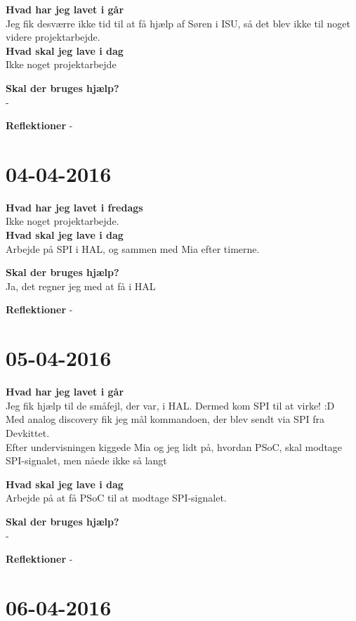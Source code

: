 \documentclass{article}
\begin{document}
	\textbf{Hvad har jeg lavet i går}\\
	Jeg fik desværre ikke tid til at få hjælp af Søren i ISU, så det blev ikke til noget videre projektarbejde.\\
	
	\textbf{Hvad skal jeg lave i dag}\\
	Ikke noget projektarbejde
	
	\textbf{Skal der bruges hjælp?}\\
	-
	
	\textbf{Reflektioner}
	-
	
	
	\section{04-04-2016}
	
	\textbf{Hvad har jeg lavet i fredags}\\
	Ikke noget projektarbejde.\\
	
	\textbf{Hvad skal jeg lave i dag}\\
	Arbejde på SPI i HAL, og sammen med Mia efter timerne.
	
	\textbf{Skal der bruges hjælp?}\\
	Ja, det regner jeg med at få i HAL
	
	\textbf{Reflektioner}
	-
	
	
	\section{05-04-2016}
	
	\textbf{Hvad har jeg lavet i går}\\
	Jeg fik hjælp til de småfejl, der var, i HAL. Dermed kom SPI til at virke! :D \\
	Med analog discovery fik jeg mål kommandoen, der blev sendt via SPI fra Devkittet.\\
	Efter undervisningen kiggede Mia og jeg lidt på, hvordan PSoC, skal modtage SPI-signalet, men nåede ikke så langt
	
	\textbf{Hvad skal jeg lave i dag}\\
	Arbejde på at få PSoC til at modtage SPI-signalet. 
	
	\textbf{Skal der bruges hjælp?}\\
	-
	
	\textbf{Reflektioner}
	-	
	
	

	\section{06-04-2016}
	
\end{document}
